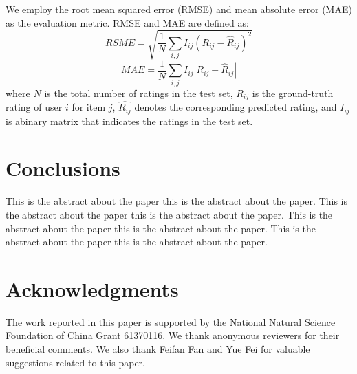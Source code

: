 \documentclass{sig-alternate-05-2015}
\begin{document}
We employ the root mean squared error (RMSE) and mean absolute error (MAE) as the evaluation metric.
RMSE and MAE are defined as:
$$ RSME = \sqrt{ \frac{1}{N} \sum_{i,j} I_{ij} (R_{ij} - \hat{R}_{ij})^2 } $$
$$ MAE = \frac{1}{N} \sum_{i,j} I_{ij} |R_{ij} - \hat{R}_{ij}| $$
where $N$ is the total number of ratings in the test set,
$R_{ij}$ is the ground-truth rating of user $i$ for item $j$,
$\hat{R_{ij}}$ denotes the corresponding predicted rating,
and $I_{ij}$ is abinary matrix that indicates the ratings in the test set.




\section{Conclusions}
This is the abstract about the paper this is the abstract about the paper.
This is the abstract about the paper this is the abstract about the paper.
This is the abstract about the paper this is the abstract about the paper.
This is the abstract about the paper this is the abstract about the paper.

\section{Acknowledgments}
The work reported in this paper is supported by the National Natural Science Foundation of China Grant 61370116.
We thank anonymous reviewers for their beneficial comments.
We also thank Feifan Fan and Yue Fei for valuable suggestions related to this paper.



\end{document}
